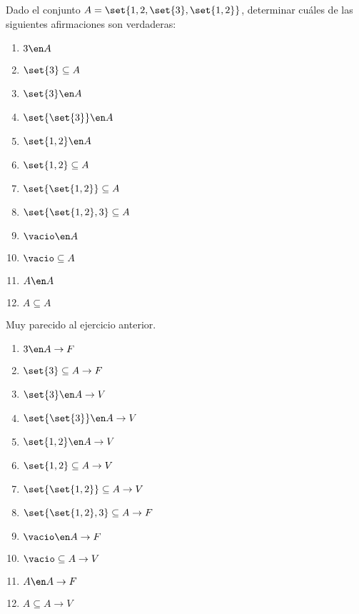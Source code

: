 \begin{enunciado}{\ejercicio}

  Dado el conjunto $A = \set{1,2,\set{3},\set{1,2}}$,
  determinar cuáles de las siguientes afirmaciones son verdaderas:

  \begin{multicols}{4}
    \begin{enumerate}[label=(\roman*)]
      \item $3 \en A         $
      \item $\set{3} \subseteq A $
      \item $\set{3} \en A    $
      \item $\set{\set{3}} \en A $
      \item $\set{1,2} \en A $
      \item $\set{1,2} \subseteq A  $
      \item $\set{\set{1,2}} \subseteq A  $
      \item $\set{\set{1,2}, 3} \subseteq A  $
      \item $\vacio \en A  $
      \item $\vacio \subseteq A  $
      \item $A \en A  $
      \item $A \subseteq A  $
    \end{enumerate}
  \end{multicols}
\end{enunciado}

Muy parecido al ejercicio anterior.

\begin{multicols}{3}
  \begin{enumerate}[label=(\roman*)]
    \item $3 \en A       \to F  $
    \item $\set{3} \subseteq A \to F$
    \item $\set{3} \en A    \to V$
    \item $\set{\set{3}} \en A \to V$
    \item $\set{1,2} \en A \to V$
    \item $\set{1,2} \subseteq A \to V $
    \item $\set{\set{1,2}} \subseteq A \to V $
    \item ${\set{\set{1,2}, 3} \subseteq A \to F}$
    \item $\vacio \en A \to F $
    \item $\vacio \subseteq A \to V $
    \item $A \en A \to F $
    \item $A \subseteq A \to V $
  \end{enumerate}
\end{multicols}

\begin{aportes}
  \item {}
\end{aportes}
